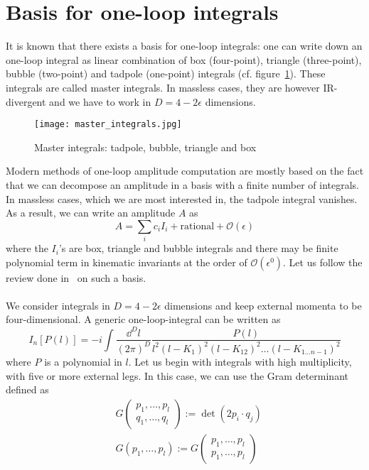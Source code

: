 \section{Basis for one-loop integrals} 
It is known that there exists a basis for one-loop integrals: one can write down an one-loop integral as linear combination of box (four-point), triangle (three-point), bubble (two-point) and tadpole (one-point) integrals (cf. figure~\ref{fig-mi}).
These integrals are called master integrals. 
In massless cases, they are however IR-divergent and we have to work in $D=4-2\epsilon$ dimensions.
\begin{figure}[h]
  \centering
  \texttt{[image: master\_integrals.jpg]}
  \caption{Master integrals: tadpole, bubble, triangle and box}
  \label{fig-mi}
\end{figure}
Modern methods of one-loop amplitude computation are mostly based on the fact that we can decompose an amplitude in a basis with a finite number of integrals.
In massless cases, which we are most interested in, the tadpole integral vanishes. 
As a result, we can write an amplitude $A$ as
\begin{equation}\label{master_equation}
A = \sum_i c_i I_i + \mathrm{rational} + \mathcal{O}(\epsilon)
\end{equation}
where the $I_i$'s are box, triangle and bubble integrals and there may be finite polynomial term in kinematic invariants at the order of $\mathcal{O}(\epsilon^0)$.
Let us follow the review done in~\cite{Gluza:2010ws} on such a basis.
\\\\
We consider integrals in $D= 4-2\epsilon$ dimensions and keep external momenta to be four-dimensional.
A generic one-loop-integral can be written as
\begin{equation}\label{generic_loop_int}
I_n[P(l)] = 
-i\int\frac{\dd^D l}{(2\pi)^D}\frac{P(l)}{l^2(l-K_1)^2(l-K_{12})^2\ldots(l-K_{1\ldots n-1})^2}
\end{equation}
where $P$ is a polynomial in $l$.
Let us begin with integrals with high multiplicity, with five or more external legs.
In this case, we can use the Gram determinant defined as
\begin{equation}
\begin{split}
& G\begin{pmatrix}
p_1,\ldots, p_l \\
q_1,\ldots, q_l 
\end{pmatrix}
:= \det(2p_i\cdot q_j)
\\
& G(p_1, \ldots , p_l) := G\begin{pmatrix}
p_1,\ldots, p_l \\
p_1,\ldots, p_l 
\end{pmatrix}
\end{split}
\end{equation} 
